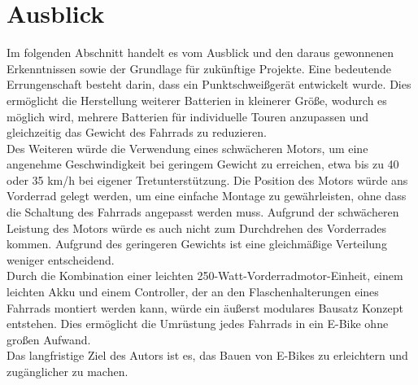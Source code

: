  \section{Ausblick}


Im folgenden Abschnitt handelt es vom Ausblick und den daraus gewonnenen Erkenntnissen sowie der Grundlage für zukünftige Projekte.
Eine bedeutende Errungenschaft besteht darin, dass ein Punktschweißgerät entwickelt wurde.
Dies ermöglicht die Herstellung weiterer Batterien in kleinerer Größe, wodurch es möglich wird, mehrere Batterien für individuelle Touren anzupassen und gleichzeitig das Gewicht des Fahrrads zu reduzieren.\\


Des Weiteren würde die Verwendung eines schwächeren Motors, um eine angenehme Geschwindigkeit bei geringem Gewicht zu erreichen, etwa bis zu 40 oder 35 km/h bei eigener Tretunterstützung. Die Position des Motors würde ans Vorderrad gelegt werden, um eine einfache Montage zu gewährleisten, ohne dass die Schaltung des Fahrrads angepasst werden muss. Aufgrund der schwächeren Leistung des Motors würde es auch nicht zum Durchdrehen des Vorderrades kommen.
Aufgrund des geringeren Gewichts ist eine gleichmäßige Verteilung weniger entscheidend.\\


Durch die Kombination einer leichten 250-Watt-Vorderradmotor-Einheit, einem leichten Akku und einem Controller, der an den Flaschenhalterungen eines Fahrrads montiert werden kann, würde ein äußerst modulares Bausatz Konzept entstehen. Dies ermöglicht die Umrüstung jedes Fahrrads in ein E-Bike ohne großen Aufwand.\\

Das langfristige Ziel des Autors ist es, das Bauen von E-Bikes zu erleichtern und zugänglicher zu machen.














